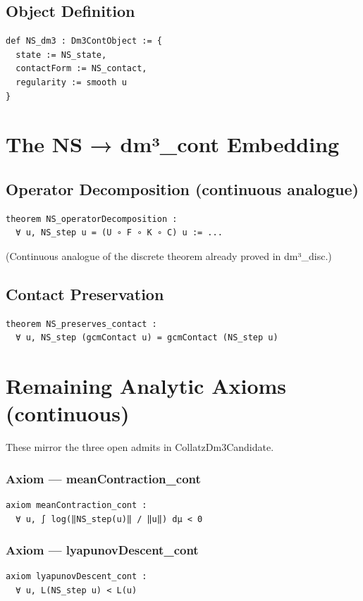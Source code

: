 \documentclass[11pt,a4paper]{article}
\begin{document}
\subsection{Object Definition}
\begin{lstlisting}
def NS_dm3 : Dm3ContObject := {
  state := NS_state,
  contactForm := NS_contact,
  regularity := smooth u
}
\end{lstlisting}

\section{The NS → dm³\_cont Embedding}

\subsection{Operator Decomposition (continuous analogue)}
\begin{lstlisting}
theorem NS_operatorDecomposition :
  ∀ u, NS_step u = (U ∘ F ∘ K ∘ C) u := ...
\end{lstlisting}
(Continuous analogue of the discrete theorem already proved in dm³\_disc.)

\subsection{Contact Preservation}
\begin{lstlisting}
theorem NS_preserves_contact :
  ∀ u, NS_step (gcmContact u) = gcmContact (NS_step u)
\end{lstlisting}

\section{Remaining Analytic Axioms (continuous)}

These mirror the three open admits in CollatzDm3Candidate.

\subsubsection{Axiom — meanContraction\_cont}
\begin{lstlisting}
axiom meanContraction_cont :
  ∀ u, ∫ log(‖NS_step(u)‖ / ‖u‖) dμ < 0
\end{lstlisting}

\subsubsection{Axiom — lyapunovDescent\_cont}
\begin{lstlisting}
axiom lyapunovDescent_cont :
  ∀ u, L(NS_step u) < L(u)
\end{lstlisting}
\end{document}
